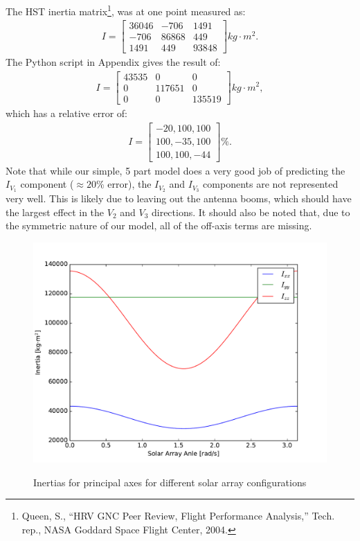 \documentclass[onecolumn,10pt]{jhwhw}
\begin{document}
The HST inertia matrix\footnote{Queen, S., ``HRV GNC Peer Review, Flight Performance Analysis,'' Tech. rep., NASA Goddard Space Flight Center, 2004.}, was at one point measured as:
\begin{align*}
I =
\begin{bmatrix}
    36046       & -706  &  1491 \\
    -706        & 86868 &   449 \\
    1491        & 449   & 93848
\end{bmatrix}
kg \cdot m^2.
\end{align*}
The Python script in Appendix gives the result of:
\begin{align*}
I =
\begin{bmatrix}
   43535 &      0 &      0 \\
       0 & 117651 &      0 \\
       0 &      0 & 135519
\end{bmatrix}
kg \cdot m^2,
\end{align*}
which has a relative error of:
\begin{align*}
I =
\begin{bmatrix}
  -20, 100, 100 \\
100,   -35, 100 \\
100, 100, -44
\end{bmatrix}
\%.
\end{align*}
Note that while our simple, 5 part model does a very good job of predicting the $I_{V_1}$ component ($\approx20$\% error), the $I_{V_2}$ and $I_{V_3}$ components are not represented very well. This is likely due to leaving out the antenna booms, which should have the largest effect in the $V_2$ and $V_3$ directions. It should also be noted that, due to the symmetric nature of our model, all of the off-axis terms are missing.

\begin{figure}[h!]
\begin{center}
\includegraphics[height=0.45\textheight]{figure1.pdf}
\label{fig:on}
\end{center}
\caption{Inertias for principal axes for different solar array configurations}
\end{figure}
\end{document}
